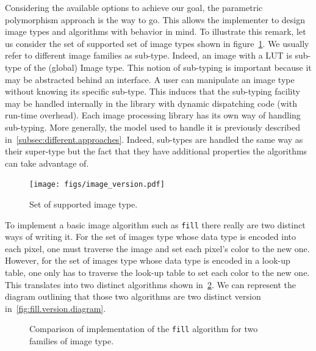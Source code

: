 Considering the available options to achieve our goal, the parametric polymorphism approach is the way to go. This
allows the implementer to design image types and algorithms with behavior in mind. To illustrate this remark, let us
consider the set of supported set of image types shown in figure~\ref{fig:image.version}. We usually refer to different
image families as sub-type. Indeed, an image with a LUT is sub-type of the (global) Image type. This notion of
sub-typing is important because it may be abstracted behind an interface. A user can manipulate an image type without
knowing its specific sub-type. This induces that the sub-typing facility may be handled internally in the library with
dynamic dispatching code (with run-time overhead). Each image processing library has its own way of handling sub-typing.
More generally, the model used to handle it is previously described in~\cref{subsec:different.approaches}. Indeed,
sub-types are handled the same way as their super-type but the fact that they have additional properties the algorithms
can take advantage of.

\begin{figure}[htbp]
  \centering
  \texttt{[image: figs/image\_version.pdf]}
  \caption{Set of supported image type.}
  \label{fig:image.version}
\end{figure}

To implement a basic image algorithm such as \texttt{fill} there really are two distinct ways of writing it. For the
set of images type whose data type is encoded into each pixel, one must traverse the image and set each pixel's color
to the new one. However, for the set of images type whose data type is encoded in a look-up table, one only has to
traverse the look-up table to set each color to the new one. This translates into two distinct algorithms shown
in~\cref{fig:traverse.vs.LUT}. We can represent the diagram outlining that those two algorithms are two distinct version
in~\cref{fig:fill.version.diagram}.

\begin{figure}[htbp]
  \centering
  \hfil

  \caption{Comparison of implementation of the \texttt{fill} algorithm for two
    families of image type.}
  \label{fig:traverse.vs.LUT}
\end{figure}

